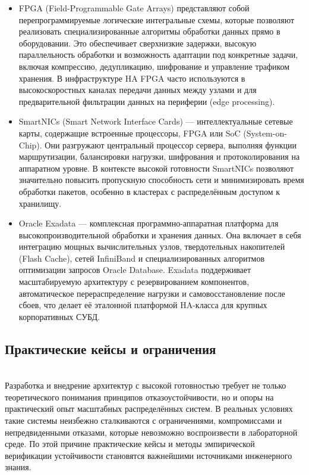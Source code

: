 \begin{itemize}
    \item FPGA (Field-Programmable Gate Arrays) представляют собой перепрограммируемые логические интегральные схемы, которые позволяют реализовать специализированные алгоритмы обработки данных прямо в оборудовании. Это обеспечивает сверхнизкие задержки, высокую параллельность обработки и возможность адаптации под конкретные задачи, включая компрессию, дедупликацию, шифрование и управление трафиком хранения. В инфраструктуре HA FPGA часто используются в высокоскоростных каналах передачи данных между узлами и для предварительной фильтрации данных на периферии (edge processing). \autocite{Dutta}
    \item SmartNICs (Smart Network Interface Cards) — интеллектуальные сетевые карты, содержащие встроенные процессоры, FPGA или SoC (System-on-Chip). Они разгружают центральный процессор сервера, выполняя функции маршрутизации, балансировки нагрузки, шифрования и протоколирования на аппаратном уровне. В контексте высокой готовности SmartNICs позволяют значительно повысить пропускную способность сети и минимизировать время обработки пакетов, особенно в кластерах с распределённым доступом к хранилищу. \autocite{Alshahrani}
    \item Oracle Exadata — комплексная программно-аппаратная платформа для высокопроизводительной обработки и хранения данных. Она включает в себя интеграцию мощных вычислительных узлов, твердотельных накопителей (Flash Cache), сетей InfiniBand и специализированных алгоритмов оптимизации запросов Oracle Database. Exadata поддерживает масштабируемую архитектуру с резервированием компонентов, автоматическое перераспределение нагрузки и самовосстановление после сбоев, что делает её эталонной платформой HA-класса для крупных корпоративных СУБД. \autocite{Exadata}
\end{itemize}

\subsection{Практические кейсы и ограничения} ~\\

Разработка и внедрение архитектур с высокой готовностью требует не только теоретического понимания принципов отказоустойчивости, но и опоры на практический опыт масштабных распределённых систем. В реальных условиях такие системы неизбежно сталкиваются с ограничениями, компромиссами и непредвиденными отказами, которые невозможно воспроизвести в лабораторной среде. По этой причине практические кейсы и методы эмпирической верификации устойчивости становятся важнейшими источниками инженерного знания.

